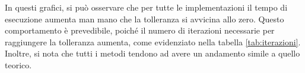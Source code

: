 In questi grafici, si può osservare che per tutte le implementazioni il tempo di
esecuzione aumenta man mano che la tolleranza si avvicina allo zero. Questo
comportamento è prevedibile, poiché il numero di iterazioni necessarie per
raggiungere la tolleranza aumenta, come evidenziato nella tabella \ref{tab:iterazioni}.
Inoltre, si nota che tutti i metodi tendono ad avere un andamento simile a quello
teorico.
\begin{table}[!ht]
    \centering
    \begin{subtable}[!ht]{1\textwidth}
        \centering

\end{subtable}
\end{table}
